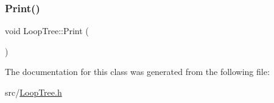 \mbox{\label{classLoopTree_ae2c8fc6279ddc72886e67cd89f28736d}} 
\subsubsection{\texorpdfstring{Print()}{Print()}}
{\footnotesize\ttfamily void Loop\+Tree\+::\+Print (\begin{DoxyParamCaption}{ }\end{DoxyParamCaption})}



The documentation for this class was generated from the following file\+:\begin{DoxyCompactItemize}
\item 
src/\hyperlink{LoopTree_8h}{Loop\+Tree.\+h}\end{DoxyCompactItemize}
